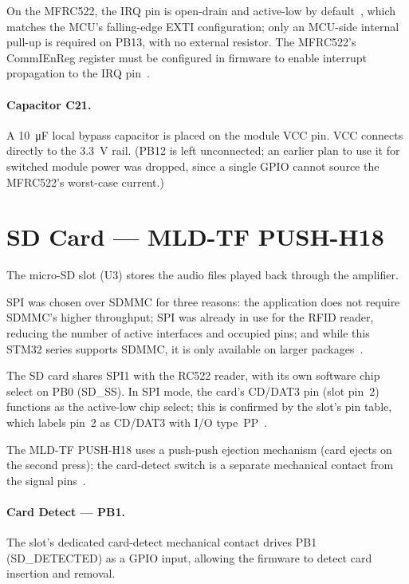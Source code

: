 On the MFRC522, the IRQ pin is open-drain and active-low by default~\cite{ref3}, which
matches the MCU's falling-edge EXTI configuration; only an MCU-side internal pull-up is
required on PB13, with no external resistor. The MFRC522's CommIEnReg register must be
configured in firmware to enable interrupt propagation to the IRQ pin~\cite{ref3}.

\paragraph{Capacitor C21.}
A \SI{10}{\micro\farad} local bypass capacitor is placed on the module VCC pin. VCC
connects directly to the \SI{3.3}{\volt} rail. (PB12 is left unconnected; an earlier plan
to use it for switched module power was dropped, since a single GPIO cannot source the
MFRC522's worst-case current.)

\section{SD Card --- MLD-TF PUSH-H18}
\label{sec:sdcard}

The micro-SD slot (U3) stores the audio files played back through the amplifier.

SPI was chosen over SDMMC for three reasons: the application does not require SDMMC's
higher throughput; SPI was already in use for the RFID reader, reducing the number of
active interfaces and occupied pins; and while this STM32 series supports SDMMC, it is
only available on larger packages~\cite{ref1}.

The SD card shares SPI1 with the RC522 reader, with its own software chip select on PB0
(SD\_SS). In SPI mode, the card's CD/DAT3 pin (slot pin~2) functions as the active-low
chip select; this is confirmed by the slot's pin table, which labels pin~2 as CD/DAT3
with I/O type~PP~\cite{ref8}.

The MLD-TF PUSH-H18 uses a push-push ejection mechanism (card ejects on the second
press); the card-detect switch is a separate mechanical contact from the signal
pins~\cite{ref8}.

\paragraph{Card Detect --- PB1.}
The slot's dedicated card-detect mechanical contact drives PB1 (SD\_DETECTED) as a GPIO
input, allowing the firmware to detect card insertion and removal.

